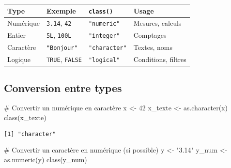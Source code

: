 \documentclass[
  french,
  11pt,
  a4paper,
]{article}
\newenvironment{Shaded}{}{}
\newcommand{\CommentTok}[1]{\textcolor[rgb]{0.42,0.45,0.49}{#1}}
\newcommand{\DecValTok}[1]{\textcolor[rgb]{0.00,0.36,0.77}{#1}}
\newcommand{\FunctionTok}[1]{\textcolor[rgb]{0.44,0.26,0.76}{#1}}
\newcommand{\NormalTok}[1]{\textcolor[rgb]{0.14,0.16,0.18}{#1}}
\newcommand{\OtherTok}[1]{\textcolor[rgb]{0.44,0.26,0.76}{#1}}
\newcommand{\StringTok}[1]{\textcolor[rgb]{0.01,0.18,0.38}{#1}}
\newcounter{none} %
\begin{document}
\begin{tcolorbox}[enhanced jigsaw, arc=.35mm, bottomrule=.15mm, bottomtitle=1mm, breakable, colback=white, colbacktitle=quarto-callout-important-color!10!white, colframe=quarto-callout-important-color-frame, coltitle=black, left=2mm, leftrule=.75mm, opacityback=0, opacitybacktitle=0.6, rightrule=.15mm, title=\textcolor{quarto-callout-important-color}{\faExclamation}\hspace{0.5em}{À retenir --- Résumé des types de données}, titlerule=0mm, toprule=.15mm, toptitle=1mm]

{\def\LTcaptype{none} %
\begin{longtable}[]{@{}llll@{}}
\toprule\noalign{}
Type & Exemple & \texttt{class()} & Usage \\
\midrule\noalign{}
\endhead
\bottomrule\noalign{}
\endlastfoot
Numérique & \texttt{3.14}, \texttt{42} & \texttt{"numeric"} & Mesures,
calculs \\
Entier & \texttt{5L}, \texttt{100L} & \texttt{"integer"} & Comptages \\
Caractère & \texttt{"Bonjour"} & \texttt{"character"} & Textes, noms \\
Logique & \texttt{TRUE}, \texttt{FALSE} & \texttt{"logical"} &
Conditions, filtres \\
\end{longtable}
}

\end{tcolorbox}

\subsection{Conversion entre types}\label{conversion-entre-types}

\begin{Shaded}
\begin{Highlighting}[]
\CommentTok{\# Convertir un numérique en caractère}
\NormalTok{x }\OtherTok{\textless{}{-}} \DecValTok{42}
\NormalTok{x\_texte }\OtherTok{\textless{}{-}} \FunctionTok{as.character}\NormalTok{(x)}
\FunctionTok{class}\NormalTok{(x\_texte)}
\end{Highlighting}
\end{Shaded}

\begin{verbatim}
[1] "character"
\end{verbatim}

\begin{Shaded}
\begin{Highlighting}[]
\CommentTok{\# Convertir un caractère en numérique (si possible)}
\NormalTok{y }\OtherTok{\textless{}{-}} \StringTok{"3.14"}
\NormalTok{y\_num }\OtherTok{\textless{}{-}} \FunctionTok{as.numeric}\NormalTok{(y)}
\FunctionTok{class}\NormalTok{(y\_num)}
\end{Highlighting}
\end{Shaded}
\end{document}
